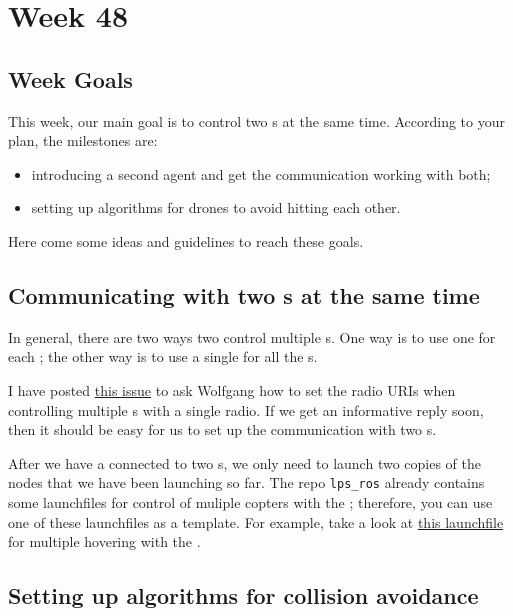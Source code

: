 \chapter*{Week 48}





\section*{Week Goals}

This week, our main goal is to control two \CF{}s at the same time.
According to your plan, the milestones are:
\begin{itemize}
  \item introducing a second agent and get the communication working with both;
  \item setting up algorithms for drones to avoid hitting each other.
\end{itemize}
Here come some ideas and guidelines to reach these goals.


\section*{Communicating with two \CF{}s at the same time}

In general, there are two ways two control multiple \CF{}s.
One way is to use one \CRPA{} for each \CF{}; the other way is to use a single \CRPA{} for all the \CF{}s.

I have posted \href{https://github.com/whoenig/crazyflie_ros/issues/50}{this issue} to ask Wolfgang how to set the radio URIs when controlling multiple \CF{}s with a single radio.
If we get an informative reply soon, then it should be easy for us to set up the communication with two \CF{}s.

After we have a \CRPA{} connected to two \CF{}s, we only need to launch two copies of the nodes that we have been launching so far.
The repo \lstinline|lps_ros| already contains some launchfiles for control of muliple copters with the \LPS{};
therefore, you can use one of these launchfiles as a template.
For example, take a look at \href{https://github.com/bitcraze/lps-ros/blob/master/launch/dwm_loc_ekf_multi_hover.launch}{this launchfile} for multiple hovering with the \EKF{}.


\section*{Setting up algorithms for collision avoidance}

